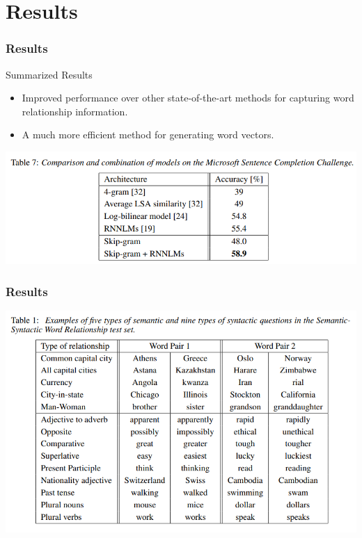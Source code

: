 \documentclass[aspectratio=169]{beamer}
\begin{document}
\section{Results}
\begin{frame}
\frametitle{Results}

Summarized Results
\begin{itemize}
    \item Improved performance over other state-of-the-art methods for capturing word relationship information.
    \item A much more efficient method for generating word vectors.
\end{itemize}

\begin{center}
\includegraphics[scale=0.5]{microsoft.png}
\end{center}

\end{frame}

\begin{frame}
\frametitle{Results}

\begin{center}
\includegraphics[scale=0.5]{speed.png}
\end{center}

\end{frame}
\end{document}
